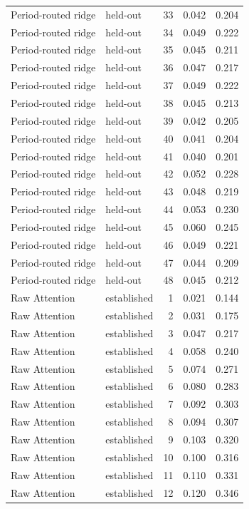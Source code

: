 \begin{tabular}{llrrr}
Period-routed ridge & held-out & 33 & 0.042 & 0.204 \\
Period-routed ridge & held-out & 34 & 0.049 & 0.222 \\
Period-routed ridge & held-out & 35 & 0.045 & 0.211 \\
Period-routed ridge & held-out & 36 & 0.047 & 0.217 \\
Period-routed ridge & held-out & 37 & 0.049 & 0.222 \\
Period-routed ridge & held-out & 38 & 0.045 & 0.213 \\
Period-routed ridge & held-out & 39 & 0.042 & 0.205 \\
Period-routed ridge & held-out & 40 & 0.041 & 0.204 \\
Period-routed ridge & held-out & 41 & 0.040 & 0.201 \\
Period-routed ridge & held-out & 42 & 0.052 & 0.228 \\
Period-routed ridge & held-out & 43 & 0.048 & 0.219 \\
Period-routed ridge & held-out & 44 & 0.053 & 0.230 \\
Period-routed ridge & held-out & 45 & 0.060 & 0.245 \\
Period-routed ridge & held-out & 46 & 0.049 & 0.221 \\
Period-routed ridge & held-out & 47 & 0.044 & 0.209 \\
Period-routed ridge & held-out & 48 & 0.045 & 0.212 \\
Raw Attention & established & 1 & 0.021 & 0.144 \\
Raw Attention & established & 2 & 0.031 & 0.175 \\
Raw Attention & established & 3 & 0.047 & 0.217 \\
Raw Attention & established & 4 & 0.058 & 0.240 \\
Raw Attention & established & 5 & 0.074 & 0.271 \\
Raw Attention & established & 6 & 0.080 & 0.283 \\
Raw Attention & established & 7 & 0.092 & 0.303 \\
Raw Attention & established & 8 & 0.094 & 0.307 \\
Raw Attention & established & 9 & 0.103 & 0.320 \\
Raw Attention & established & 10 & 0.100 & 0.316 \\
Raw Attention & established & 11 & 0.110 & 0.331 \\
Raw Attention & established & 12 & 0.120 & 0.346 \\

\end{tabular}
